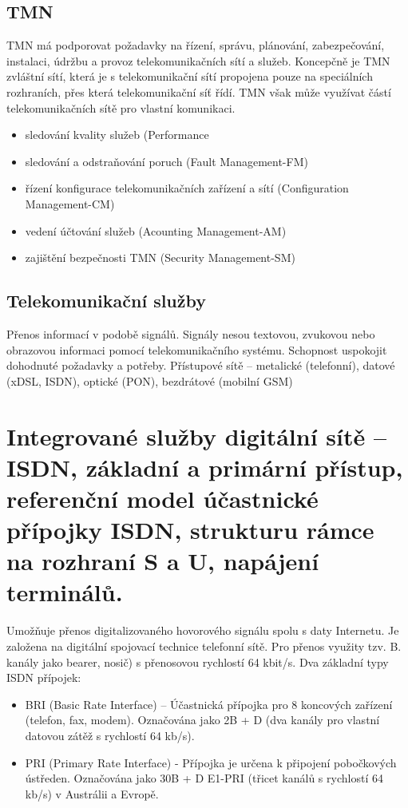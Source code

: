 \subsection{TMN}
TMN má podporovat požadavky na řízení, správu, plánování, zabezpečování, instalaci, údržbu a provoz telekomunikačních sítí a služeb. Koncepčně je TMN zvláštní sítí, která je s telekomunikační sítí propojena pouze na speciálních rozhraních, přes která telekomunikační síť řídí. TMN však může využívat částí telekomunikačních sítě pro vlastní komunikaci.
\begin{itemize}
    \item sledování kvality služeb (Performance
    \item sledování a odstraňování poruch (Fault Management-FM)
    \item řízení konfigurace telekomunikačních zařízení a sítí (Configuration Management-CM)
    \item vedení účtování služeb (Acounting Management-AM)
    \item zajištění bezpečnosti TMN (Security Management-SM)
\end{itemize}


\subsection{Telekomunikační služby}
Přenos informací v podobě signálů. Signály nesou textovou, zvukovou nebo obrazovou informaci pomocí telekomunikačního systému. Schopnost uspokojit dohodnuté požadavky a potřeby. 
Přístupové sítě -- metalické (telefonní), datové (xDSL, ISDN), optické (PON), bezdrátové (mobilní GSM)


\newpage
\section{Integrované služby digitální sítě – ISDN, základní a primární přístup, referenční model účastnické přípojky ISDN, strukturu rámce na rozhraní S a U, napájení terminálů.}
Umožňuje přenos digitalizovaného hovorového signálu spolu s daty Internetu. Je založena na digitální spojovací technice telefonní sítě.
Pro přenos využity tzv. B. kanály jako bearer, nosič) s přenosovou rychlostí 64 kbit/s.
Dva základní typy ISDN přípojek:
\begin{itemize}
    \item BRI (Basic Rate Interface) – Účastnická přípojka pro 8 koncových zařízení (telefon, fax, modem). Označována jako 2B + D (dva kanály pro vlastní datovou zátěž s rychlostí 64 kb/s).
    \item PRI (Primary Rate Interface) - Přípojka je určena k připojení pobočkových ústředen. Označována jako 30B + D E1-PRI (třicet kanálů s rychlostí 64 kb/s) v Austrálii a Evropě.
\end{itemize}

